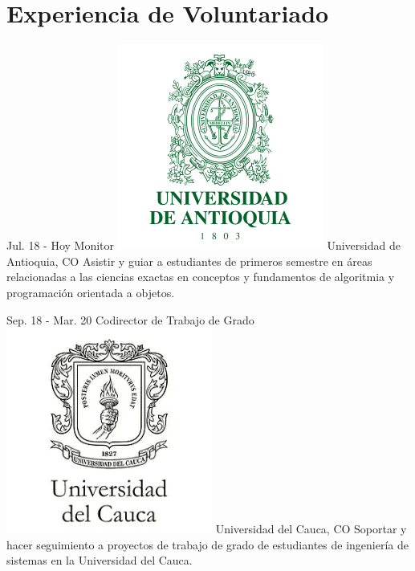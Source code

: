 \documentclass[]{cv-class}
\begin{document}
\newpage

\section{Experiencia de Voluntariado}
\begin{entrylist}
	  
	\entry
	{Jul. 18 - Hoy}
	{Monitor}
	{{\includegraphics[scale=0.05]{img/udea-logo.png}} Universidad de Antioquia, CO} 
	{\justifying Asistir y guiar a estudiantes de primeros semestre en áreas relacionadas a las ciencias exactas en conceptos y fundamentos de algoritmia y programación orientada a objetos.}
	  
	\entry
	{Sep. 18 - Mar. 20}
	{Codirector de Trabajo de Grado}
	{{\includegraphics[scale=0.05]{img/unicauca-logo.png}} Universidad del Cauca, CO} 
	{\justifying Soportar y hacer seguimiento a proyectos de trabajo de grado de estudiantes de ingeniería de sistemas en la Universidad del Cauca.}
	

\end{entrylist}
\end{document}
